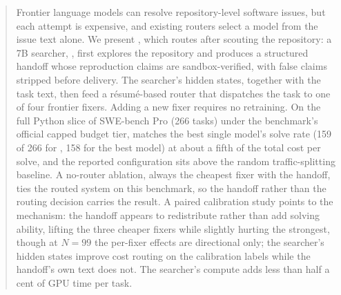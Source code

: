 
\begin{abstract}
Frontier language models can resolve repository-level software issues, but each
attempt is expensive, and existing routers select a model from the issue text
alone.  We present \sysname{}, which routes after scouting the repository: a 7B searcher,
\modelname{}, first explores the repository and produces a structured handoff
whose reproduction claims are sandbox-verified, with false claims stripped
before delivery.  The searcher's hidden states, together with the task text, then feed a
r\'esum\'e-based router that dispatches the task to one of four frontier
fixers.  Adding a new
fixer requires no retraining.  On the full Python slice of SWE-bench Pro (266
tasks) under the benchmark's official capped budget tier, \sysname{} matches
the best single model's solve rate (159 of 266 for \sysname{}, 158 for the
best model) at about a fifth of the
total cost per solve, and the reported configuration sits above the random
traffic-splitting baseline.  A no-router ablation, always the cheapest fixer
with the handoff, ties the routed system on this benchmark, so the handoff
rather than the routing decision carries the result.  A paired calibration
study points to the mechanism: the handoff appears to redistribute rather than
add solving ability, lifting the three cheaper fixers while slightly hurting
the strongest, though at $N{=}99$ the per-fixer effects are directional only;
the searcher's hidden states improve cost routing on the calibration labels
while the handoff's own text does not.  The searcher's compute adds less than half a cent of GPU time per
task.
\end{abstract}
